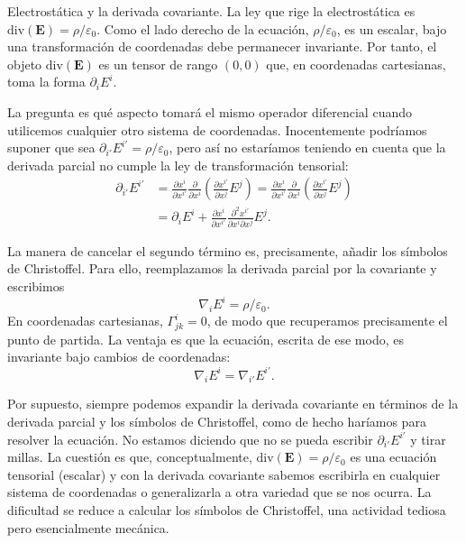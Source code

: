 \begin{example}
    {Electrostática y la derivada covariante.
    \label{ej.4-electrostatica_covariante}}
    La ley que rige la electrostática es \(\text{div}(\mathbf{E}) = \rho/\varepsilon_0\). Como el lado derecho de la ecuación, \(\rho/\varepsilon_0\), es un escalar, bajo una transformación de coordenadas debe permanecer invariante. Por tanto, el objeto \(\text{div}(\mathbf{E})\) es un tensor de rango \((0,0)\) que, en coordenadas cartesianas, toma la forma \(\partial_i E^i\). 
    
    La pregunta es qué aspecto tomará el mismo operador diferencial cuando utilicemos cualquier otro sistema de coordenadas. Inocentemente podríamos suponer que sea \(\partial_{i'} E^{i'} = \rho/\varepsilon_0\), pero así no estaríamos teniendo en cuenta que la derivada parcial no cumple la ley de transformación tensorial:
    \begin{align*}
        \partial_{i'} E^{i'} &= \frac{\partial x^i}{\partial x^{i'}}\frac{\partial}{\partial x^i}\left(\frac{\partial x^{i'}}{\partial x^j} E^j\right) = \frac{\partial x^i}{\partial x^{i'}}\frac{\partial}{\partial x^i}\left(\frac{\partial x^{i'}}{\partial x^j} E^j\right) \\
        &= \partial_i E^i + \frac{\partial x^i}{\partial x^{i'}}\frac{\partial^2 x^{i'}}{\partial x^i\partial x^j} E^j.
    \end{align*}

    La manera de cancelar el segundo término es, precisamente, añadir los símbolos de Christoffel. Para ello, reemplazamos la derivada parcial por la covariante y escribimos
    \begin{equation*}
        \nabla_i E^i = \rho/\varepsilon_0.
    \end{equation*}
    En coordenadas cartesianas, \(\Gamma^{i}_{jk} = 0\), de modo que recuperamos precisamente el punto de partida. La ventaja es que la ecuación, escrita de ese modo, es invariante bajo cambios de coordenadas:
    \begin{equation*}
        \nabla_i E^i = \nabla_{i'} E^{i'}.
    \end{equation*}
    
    Por supuesto, siempre podemos expandir la derivada covariante en términos de la derivada parcial y los símbolos de Christoffel, como de hecho haríamos para resolver la ecuación. No estamos diciendo que no se pueda escribir \(\partial_{i'}E^{i'}\) y tirar millas. La cuestión es que, conceptualmente, \(\text{div}(\mathbf{E}) = \rho/\varepsilon_0\) es una ecuación tensorial (escalar) y con la derivada covariante sabemos escribirla en cualquier sistema de coordenadas o generalizarla a otra variedad que se nos ocurra. La dificultad se reduce a calcular los símbolos de Christoffel, una actividad tediosa pero esencialmente mecánica.
\end{example}


